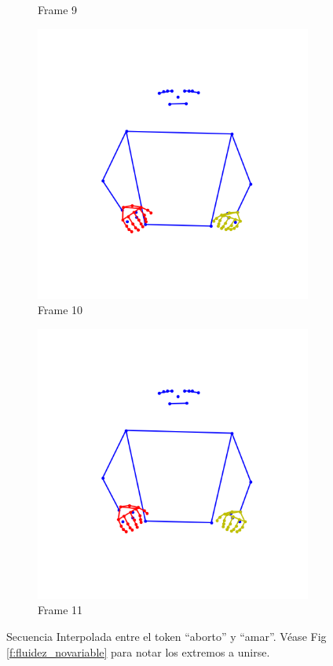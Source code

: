 \begin{figure}[t]
\begin{subfigure}[t]{0.3\textwidth}
		\caption{Frame 9}
		\label{f:frame9}
	\end{subfigure}
	\begin{subfigure}[t]{0.3\textwidth}
	\centering
		\includegraphics[align=t,width=0.9\linewidth, height =0.9\linewidth]{Graphics/interpol_aborto_amar_10.png}
		\caption{Frame 10}
		\label{f:frame10}
	\end{subfigure}
	\begin{subfigure}[t]{0.3\textwidth}
	\centering
		\includegraphics[align=t,width=0.9\linewidth, height =0.9\linewidth]{Graphics/interpol_aborto_amar_11.png}
		\caption{Frame 11 }
		\label{f:frame11}
	\end{subfigure}
	\caption{Secuencia Interpolada entre el token ``aborto'' y ``amar''. Véase Fig \ref{f:fluidez_novariable} para notar los extremos a unirse.}
	\label{f:seq_interpol}
\end{figure}
